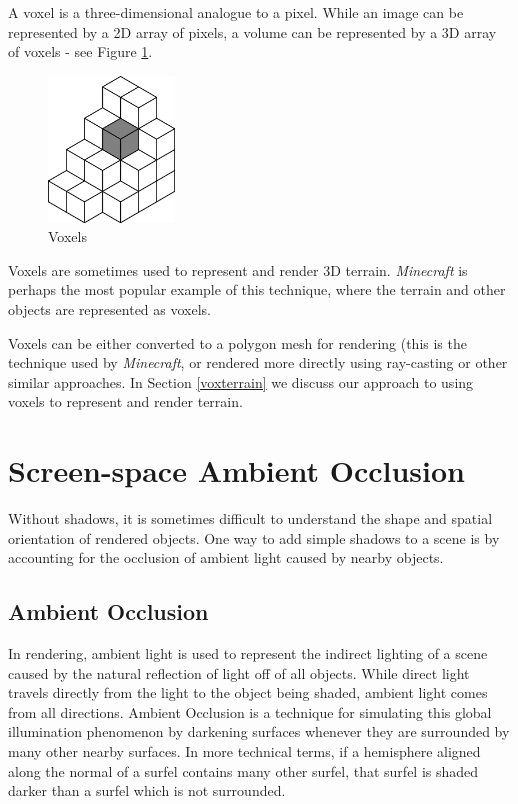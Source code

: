 A voxel is a three-dimensional analogue to a pixel.
While an image can be represented by a 2D array of pixels, a volume can be represented by a 3D array of voxels - see Figure \ref{fig:voxels}.

\begin{figure}
	\centering
		\includegraphics[width=0.3\textwidth]{figures/voxels}
	\caption{Voxels}
	\label{fig:voxels}
\end{figure}

Voxels are sometimes used to represent and render 3D terrain.
{\em Minecraft} is perhaps the most popular example of this technique, where the terrain and other objects are represented as voxels.

Voxels can be either converted to a polygon mesh for rendering (this is the technique used by {\em Minecraft}, or rendered more directly using ray-casting or other similar approaches.
In Section \ref{voxterrain} we discuss our approach to using voxels to represent and render terrain.


\section{Screen-space Ambient Occlusion} \label{ssao}

Without shadows, it is sometimes difficult to understand the shape and spatial orientation of rendered objects.
One way to add simple shadows to a scene is by accounting for the occlusion of ambient light caused by nearby objects.


\subsection{Ambient Occlusion}

In rendering, ambient light is used to represent the indirect lighting of a scene caused by the natural reflection of light off of all objects.
While direct light travels directly from the light to the object being shaded, ambient light comes from all directions.
Ambient Occlusion is a technique for simulating this global illumination phenomenon by darkening surfaces whenever they are surrounded by many other nearby surfaces.
In more technical terms, if a hemisphere aligned along the normal of a surfel contains many other surfel, that surfel is shaded darker than a surfel which is not surrounded.


